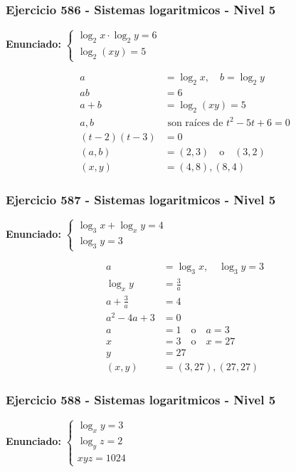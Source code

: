 \documentclass[12pt,a4paper]{article}
\begin{document}
\subsubsection*{Ejercicio 586 - Sistemas logaritmicos - Nivel 5}
\textbf{Enunciado:} \(\begin{cases}\log_2x\cdot\log_2y=6\\ \log_2(xy)=5\end{cases}\)

\[
\begin{aligned}
a&=\log_2x,
\quad b=\log_2y\\
ab&=6\\
a+b&=\log_2(xy)=5\\
a,b&\text{ son raíces de } t^2-5t+6=0\\
(t-2)(t-3)&=0\\
(a,b)&=(2,3)\quad \text{o}\quad (3,2)\\
(x,y)&=\boxed{(4,8),(8,4)}
\end{aligned}
\]


\subsubsection*{Ejercicio 587 - Sistemas logaritmicos - Nivel 5}
\textbf{Enunciado:} \(\begin{cases}\log_3x+\log_xy=4\\ \log_3y=3\end{cases}\)

\[
\begin{aligned}
a&=\log_3x,
\quad \log_3y=3\\
\log_xy&=\frac3a\\
a+\frac3a&=4\\
a^2-4a+3&=0\\
a&=1\quad \text{o}\quad a=3\\
x&=3\quad \text{o}\quad x=27\\
y&=27\\
(x,y)&=\boxed{(3,27),(27,27)}
\end{aligned}
\]


\subsubsection*{Ejercicio 588 - Sistemas logaritmicos - Nivel 5}
\textbf{Enunciado:} \(\begin{cases}\log_xy=3\\ \log_yz=2\\ xyz=1024\end{cases}\)
\end{document}

